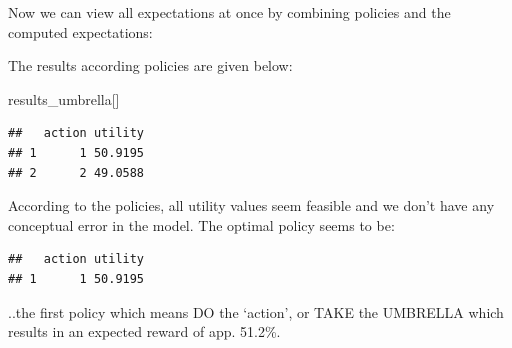 \documentclass[
]{article}
\newenvironment{Shaded}{\begin{snugshade}}{\end{snugshade}}
\newcommand{\ControlFlowTok}[1]{\textcolor[rgb]{0.13,0.29,0.53}{\textbf{#1}}}
\newcommand{\DecValTok}[1]{\textcolor[rgb]{0.00,0.00,0.81}{#1}}
\newcommand{\FunctionTok}[1]{\textcolor[rgb]{0.00,0.00,0.00}{#1}}
\newcommand{\NormalTok}[1]{#1}
\newcommand{\OtherTok}[1]{\textcolor[rgb]{0.56,0.35,0.01}{#1}}
\newcommand{\SpecialCharTok}[1]{\textcolor[rgb]{0.00,0.00,0.00}{#1}}
\newcommand{\StringTok}[1]{\textcolor[rgb]{0.31,0.60,0.02}{#1}}
\begin{document}
Now we can view all expectations at once by combining policies and the computed expectations:

\begin{Shaded}
\end{Shaded}

The results according policies are given below:

\begin{Shaded}
\begin{Highlighting}[]
\NormalTok{results\_umbrella[]}
\end{Highlighting}
\end{Shaded}

\begin{verbatim}
##   action utility
## 1      1 50.9195
## 2      2 49.0588
\end{verbatim}

According to the policies, all utility values seem feasible and we don't have any conceptual error in the model.
The optimal policy seems to be:

\begin{Shaded}
\end{Shaded}

\begin{verbatim}
##   action utility
## 1      1 50.9195
\end{verbatim}

..the first policy which means DO the `action', or TAKE the UMBRELLA which results in an expected reward of app. 51.2\%.
\end{document}
